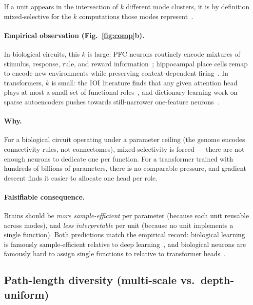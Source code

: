 \documentclass[11pt,a4paper]{article}
\begin{document}
If a unit appears in the intersection of $k$ different mode clusters,
it is by definition mixed-selective for the $k$ computations those
modes represent~\cite{rigotti2013importance}.

\paragraph{Empirical observation (Fig.~\ref{fig:comp}b).} In
biological circuits, this $k$ is large: PFC neurons routinely encode
mixtures of stimulus, response, rule, and reward
information~\cite{rigotti2013importance,fusi2016neurons}; hippocampal
place cells remap to encode new environments while preserving
context-dependent
firing~\cite{leutgeb2007pattern,colgin2008understanding}. In
transformers, $k$ is small: the IOI literature finds that any given
attention head plays at most a small set of functional
roles~\cite{wang2022interpretability}, and dictionary-learning work
on sparse autoencoders pushes towards still-narrower one-feature
neurons~\cite{cunningham2023sparse,bricken2023monosemanticity}.

\paragraph{Why.} For a biological circuit operating under a parameter
ceiling (the genome encodes connectivity rules, not connectomes),
mixed selectivity is forced --- there are not enough neurons to
dedicate one per function. For a transformer trained with hundreds of
billions of parameters, there is no comparable pressure, and gradient
descent finds it easier to allocate one head per role.

\paragraph{Falsifiable consequence.} Brains should be \emph{more
sample-efficient} per parameter (because each unit reusable across
modes), and \emph{less interpretable} per unit (because no unit
implements a single function). Both predictions match the empirical
record: biological learning is famously sample-efficient relative to
deep learning~\cite{lake2017building}, and biological neurons are
famously hard to assign single functions to relative to
transformer heads~\cite{rigotti2013importance,olah2017zoom}.

\subsection{Path-length diversity (multi-scale vs.\ depth-uniform)}
\end{document}
